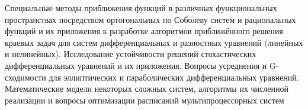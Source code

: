 \begin{center}
{\large
Специальные методы приближения функций в различных функциональных 
пространствах посредством ортогональных по Соболеву систем 
и рациональных функций и их приложения к разработке алгоритмов 
приближённого решения краевых задач для систем дифференциальных и 
разностных уравнений (линейных и нелинейных). Исследование устойчивости 
решений стохастических дифференциальных уравнений и их приложения. 
Вопросы усреднения и G-сходимости для эллиптических и параболических 
дифференциальных уравнений. Математические модели некоторых сложных 
систем, алгоритмы их численной реализации и вопросы оптимизации 
расписаний мультипроцессорных систем
}
\\[12pt]
\end{center}
